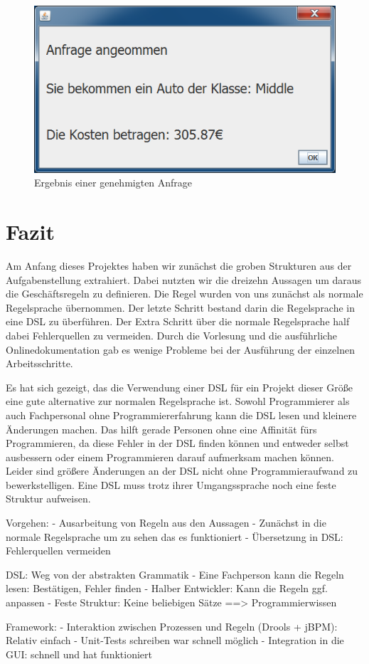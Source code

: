 \begin{figure}
	\centering
	\includegraphics[width=0.7\linewidth]{Bilder/Screenshots/ergebnis}
	\caption{Ergebnis einer genehmigten Anfrage}
	\label{fig:ergebnis}
\end{figure}

\section{Fazit}
Am Anfang dieses Projektes haben wir zunächst die groben Strukturen aus der Aufgabenstellung extrahiert. Dabei nutzten wir die dreizehn Aussagen um daraus die Geschäftsregeln zu definieren. Die Regel wurden von uns zunächst als normale Regelsprache übernommen. Der letzte Schritt bestand darin die Regelsprache in eine DSL zu überführen. Der Extra Schritt über die normale Regelsprache half dabei Fehlerquellen zu vermeiden. Durch die Vorlesung und die ausführliche Onlinedokumentation gab es wenige Probleme bei der Ausführung der einzelnen Arbeitsschritte.

Es hat sich gezeigt, das die Verwendung einer DSL für ein Projekt dieser Größe eine gute alternative zur normalen Regelsprache ist. Sowohl Programmierer als auch Fachpersonal ohne Programmiererfahrung kann die DSL lesen und kleinere Änderungen machen. Das hilft gerade Personen ohne eine Affinität fürs Programmieren, da diese Fehler in der DSL finden können und entweder selbst ausbessern oder einem Programmieren darauf aufmerksam machen können. Leider sind größere Änderungen an der DSL nicht ohne Programmieraufwand zu bewerkstelligen. Eine DSL muss trotz ihrer Umgangssprache noch eine feste Struktur aufweisen.



Vorgehen:
- Ausarbeitung von Regeln aus den Aussagen
- Zunächst in die normale Regelsprache um zu sehen das es funktioniert
- Übersetzung in DSL: Fehlerquellen vermeiden

DSL: Weg von der abstrakten Grammatik
- Eine Fachperson kann die Regeln lesen: Bestätigen, Fehler finden
- Halber Entwickler: Kann die Regeln ggf. anpassen
- Feste Struktur: Keine beliebigen Sätze ==> Programmierwissen

Framework:
- Interaktion zwischen Prozessen und Regeln (Drools + jBPM): Relativ einfach
- Unit-Tests schreiben war schnell möglich
- Integration in die GUI: schnell und hat funktioniert

%



